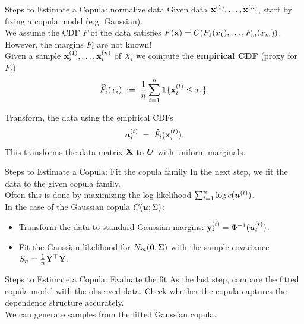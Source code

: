 \documentclass[11pt,handout,aspectratio=169]{beamer}
\begin{document}
\begin{frame}{Steps to Estimate a Copula: normalize data}
	Given data $\mathbf{x}^{(1)},\ldots,\mathbf{x}^{(n)}$, start by fixing a copula model (e.g. Gaussian).\\[3mm]
	
	We assume the CDF $F$ of the data satisfies $F(\mathbf{x})=C(F_1(x_1),\ldots,F_m(x_m))$.\\[3mm]
	
	However, \alert{the margins $F_i$ are not known!}\\[3mm]
	
	Given a sample $\mathbf{x}_i^{(1)},\ldots,\mathbf{x}_i^{(n)}$ of $X_i$ we compute the \textbf{empirical CDF} (proxy for $F_i$)
	$$
	\widehat F_i(x_i)\;:=\;\frac1n \sum_{t=1}^n \boldsymbol 1\{\mathbf{x}_i^{(t)}\leq x_i\}.
	$$
	\vspace{-5mm}
\begin{alertblock}{}
	Transform, the data using the empirical CDFs
$$
\boldsymbol u^{(t)}_i\;=\;\widehat F_i(\mathbf{x}^{(t)}_i).
$$
This transforms the data matrix $\mathbf{X}$ to $\boldsymbol U$ with uniform marginals. 
\end{alertblock}\end{frame}


\begin{frame}{Steps to Estimate a Copula: Fit the copula family}
In the next step, we fit the data to the given copula family. \\[3mm]

Often this is done by maximizing the log-likelihood $\sum_{t=1}^n \log c(\boldsymbol u^{(t)})$.\\[3mm]

In the case of the Gaussian copula $C(\boldsymbol u;\Sigma)$:
\begin{itemize}
	\item Transform the data to standard Gaussian margins: $\mathbf{y}^{(t)}_i=\Phi^{-1}(\boldsymbol u^{(t)}_i)$.
	\item Fit the Gaussian likelihood for $N_m(\boldsymbol 0,\Sigma)$ with the sample covariance  $S_n=\tfrac1n \mathbf{Y}^\top \mathbf{Y}$.
\end{itemize}
\end{frame}


\begin{frame}{Steps to Estimate a Copula: Evaluate the fit}
As the last step, compare the fitted copula model with the observed data. Check whether the copula captures the dependence structure accurately.\\[3mm]
We can generate samples from the fitted Gaussian copula.
\end{frame}
\end{document}
